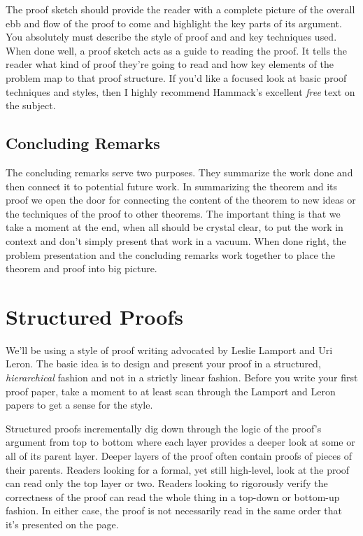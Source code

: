 \documentclass{tufte-handout}
\begin{document}
The proof sketch should provide the reader with a complete picture of the overall ebb and flow of the proof to come and highlight the key parts of its argument. You absolutely must describe the style of proof and and key techniques used.  When done well, a proof sketch acts as a guide to reading the proof. It tells the reader what kind of proof they're going to read and how key elements of the problem map to that proof structure. If you'd like a focused look at basic proof techniques and styles, then I highly recommend Hammack's excellent \textit{free} text on the subject\cite{Hammack2013}.

\subsection{ Concluding Remarks }

The concluding remarks serve two purposes. They summarize the work done and then connect it to potential future work. In summarizing the theorem and its proof we open the door for connecting the content of the theorem to new ideas or the techniques of the proof to other theorems. The important thing is that we take a moment at the end, when all should be crystal clear, to put the work in context and don't simply present that work in a vacuum. When done right, the problem presentation and the concluding remarks work together to place the theorem and proof into big picture.

\section{Structured Proofs}

We'll be using a style of proof writing advocated by Leslie Lamport\cite{Lamport2012,Lamport1993} and Uri Leron\cite{Leron1983}. The basic idea is to design and present your proof in a structured, \textit{hierarchical} fashion and not in a strictly linear fashion. Before you write your first proof paper, take a moment to at least scan through the Lamport and Leron papers to get a sense for the style.

Structured proofs incrementally dig down through the logic of the proof's argument from top to bottom where each layer provides a deeper look at some or all of its parent layer. Deeper layers of the proof often contain proofs of pieces of their parents. Readers looking for a formal, yet still high-level, look at the proof can read only the top layer or two.  Readers looking to rigorously verify the correctness of the proof can read the whole thing in a top-down or bottom-up fashion. In either case, the proof is not necessarily read in the same order that it's presented on the page.
\end{document}
